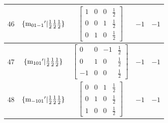 \documentclass[fleqn,8pt]{jsarticle}
\begin{document}
\begin{longtable}{ccccc}
$ 46 $ & $ \{{\rm m}_{01-1}{}'|\frac{1}{2} \frac{1}{2} \frac{1}{2}\} $ & $ \begin{bmatrix} 1 & 0 & 0 & \frac{1}{2} \\ 0 & 0 & 1 & \frac{1}{2} \\ 0 & 1 & 0 & \frac{1}{2} \end{bmatrix} $ & $ -1 $ & $ -1 $ \\ \hline
$ 47 $ & $ \{{\rm m}_{101}{}'|\frac{1}{2} \frac{1}{2} \frac{1}{2}\} $ & $ \begin{bmatrix} 0 & 0 & -1 & \frac{1}{2} \\ 0 & 1 & 0 & \frac{1}{2} \\ -1 & 0 & 0 & \frac{1}{2} \end{bmatrix} $ & $ -1 $ & $ -1 $ \\ \hline
$ 48 $ & $ \{{\rm m}_{-101}{}'|\frac{1}{2} \frac{1}{2} \frac{1}{2}\} $ & $ \begin{bmatrix} 0 & 0 & 1 & \frac{1}{2} \\ 0 & 1 & 0 & \frac{1}{2} \\ 1 & 0 & 0 & \frac{1}{2} \end{bmatrix} $ & $ -1 $ & $ -1 $ \\
\end{longtable}
\end{document}
